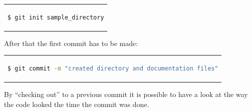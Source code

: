 \documentclass[12pt,a4paper]{article}
\begin{document}
\begin{center}
\begin{tabular}{c}
\begin{lstlisting}[language=bash]
  $ git init sample_directory
\end{lstlisting}
\end{tabular}
\end{center}
If if been working on this project before without starting git from the beginning I would have to add all files to git, otherwise I could specify specific files:
\begin{center}
\begin{tabular}{c}
\begin{lstlisting}[language=bash]
  $ git add *
\end{lstlisting}
\end{tabular}
\end{center}
After that the first commit has to be made:
\begin{center}
\begin{tabular}{c}
\begin{lstlisting}[language=bash]
  $ git commit -m "created directory and documentation files"
\end{lstlisting}
\end{tabular}
\end{center}
More often than not I am using a service like github.com to backup my work. This means
that the remote service has to be set up: 
\begin{center}
\begin{tabular}{c}
\begin{lstlisting}[language=bash]
$ git remote add origin url
# sets a new remote server
$ git remote -v
# verifies the new service  
\end{lstlisting}
\end{tabular}
\end{center}
Another useful feature I learned about is the possibility to take a look at a previous commit. \cite{OldCommits} Therefore
the git log feature makes it easy to have a better look at the commits:
\begin{center}
\begin{tabular}{c}
\begin{lstlisting}[language=bash]
  $ git log --oneline
\end{lstlisting}
\end{tabular}
\end{center}
By ``checking out'' to a previous commit it is possible to have a look at the way the code looked the time the commit was done.
\end{document}
